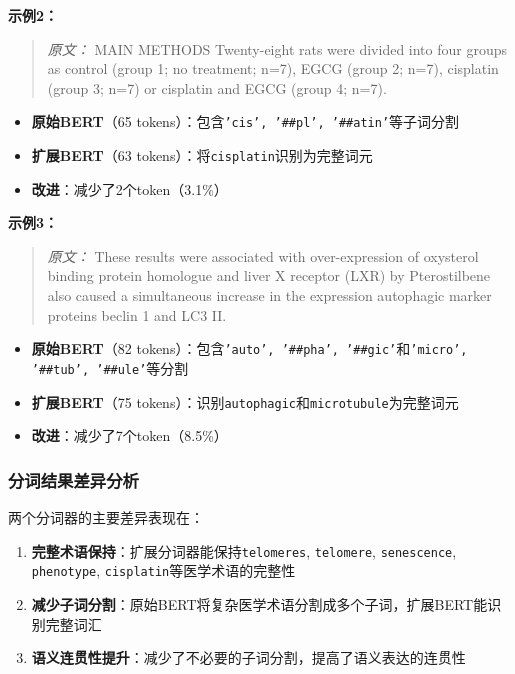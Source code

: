 \documentclass[12pt,letterpaper]{article}
\begin{document}
\textbf{示例2：}
\begin{quote}
\textit{原文：} MAIN METHODS Twenty-eight rats were divided into four groups as control (group 1; no treatment; n=7), EGCG (group 2; n=7), cisplatin (group 3; n=7) or cisplatin and EGCG (group 4; n=7).
\end{quote}

\begin{itemize}
    \item \textbf{原始BERT}（65 tokens）：包含\texttt{'cis', '\#\#pl', '\#\#atin'}等子词分割
    \item \textbf{扩展BERT}（63 tokens）：将\texttt{cisplatin}识别为完整词元
    \item \textbf{改进}：减少了2个token（3.1\%）
\end{itemize}

\textbf{示例3：}
\begin{quote}
\textit{原文：} These results were associated with over-expression of oxysterol binding protein homologue and liver X receptor (LXR) by Pterostilbene also caused a simultaneous increase in the expression autophagic marker proteins beclin 1 and LC3 II.
\end{quote}

\begin{itemize}
    \item \textbf{原始BERT}（82 tokens）：包含\texttt{'auto', '\#\#pha', '\#\#gic'}和\texttt{'micro', '\#\#tub', '\#\#ule'}等分割
    \item \textbf{扩展BERT}（75 tokens）：识别\texttt{autophagic}和\texttt{microtubule}为完整词元
    \item \textbf{改进}：减少了7个token（8.5\%）
\end{itemize}

\subsubsection{分词结果差异分析}

两个分词器的主要差异表现在：

\begin{enumerate}
    \item \textbf{完整术语保持}：扩展分词器能保持\texttt{telomeres}, \texttt{telomere}, \texttt{senescence}, \texttt{phenotype}, \texttt{cisplatin}等医学术语的完整性
    \item \textbf{减少子词分割}：原始BERT将复杂医学术语分割成多个子词，扩展BERT能识别完整词汇
    \item \textbf{语义连贯性提升}：减少了不必要的子词分割，提高了语义表达的连贯性
\end{enumerate}
\end{document}

